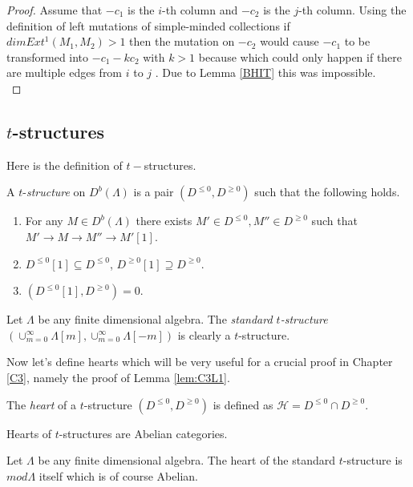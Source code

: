 \begin{proof}
Assume that $-c_1$ is the $i$-th column and $-c_2$ is the $j$-th column. Using the definition of left mutations of simple-minded collections if $dim Ext^1(M_1, M_2) > 1$ then the mutation on $-c_2$ would cause $-c_1$ to be transformed into $-c_1-kc_2$ with $k>1$ because which could only happen if there are multiple edges from $i$ to $j$ \cite{KY12}. Due to Lemma \ref{BHIT} this was impossible.\\
\end{proof}
\subsection{$t$-structures}
\indent Here is the definition of $t-$structures.
\begin{definition}
A $t$-\textit{structure} on $D^b(\Lambda)$ is a pair $(D^{\leq 0},D^{\geq 0})$ such that the following holds.
\begin{enumerate}
\item For any $M\in D^b(\Lambda)$ there exists $M'\in D^{\leq 0}, M''\in D^{\geq 0}$ such that $M'\to M\to M''\to M'[1]$.
\item $D^{\leq 0}[1]\subseteq D^{\leq 0}$,  $D^{\geq 0}[1]\supseteq D^{\geq 0}$.
\item $(D^{\leq 0}[1], D^{\geq 0}) = 0$.
\end{enumerate}
\end{definition}
\begin{example}
Let $\Lambda$ be any finite dimensional algebra. The \textit{standard $t$-structure}\\ $(\cup_{m=0}^{\infty}\Lambda[m], \cup_{m=0}^{\infty}\Lambda[-m])$ is clearly a $t$-structure.
\end{example}
\indent Now let's define hearts which will be very useful for a crucial proof in Chapter \ref{C3}, namely the proof of Lemma \ref{lem:C3L1}.
\begin{definition}
The \textit{heart} of a $t$-structure $(D^{\leq 0},D^{\geq 0})$ is defined as $\mathcal{H} = D^{\leq 0}\cap D^{\geq 0}$.
\end{definition}
\begin{theorem}
\cite{BBD} Hearts of $t$-structures are Abelian categories. 
\end{theorem}
\begin{example}
Let $\Lambda$ be any finite dimensional algebra. The heart of the standard $t$-structure is $mod \Lambda$ itself which is of course Abelian.
\end{example}

